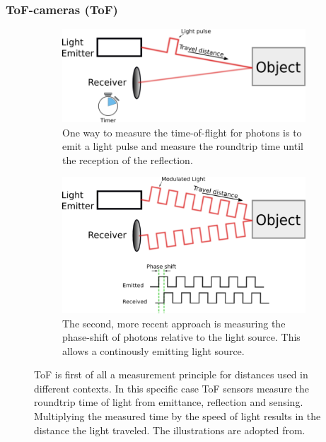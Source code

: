 \subsubsection{\acrlong{ToF}-cameras (\acrshort{ToF})}

\begin{figure}[H]
    \centering
    \begin{subfigure}[t]{0.45\textwidth}
        \includegraphics[width=\textwidth]{chapter03/img/tof_traveltime_original.png}
        \caption{One way to measure the time-of-flight for photons is to emit a light pulse and measure the roundtrip time until the reception of the reflection.}\label{fig:tof_roundtrip}
    \end{subfigure}
    \begin{subfigure}[t]{0.45\textwidth}
        \includegraphics[width=\textwidth]{chapter03/img/tof_phase_shift_original.png}
        \caption{The second, more recent approach is measuring the phase-shift of photons relative to the light source. This allows a continously emitting light source.}\label{fig:tof_phase_shift}
    \end{subfigure}
    \caption[Illustration of two commonly used measuring principle for \acrshort{ToF} cameras]{\acrlong{ToF} is first of all a measurement principle for distances used in different contexts. In this specific case \acrshort{ToF} sensors measure the roundtrip time of light from emittance, reflection and sensing. Multiplying the measured time by the speed of light results in the distance the light traveled. The illustrations are adopted from\cite{tof_cameras}.}\label{fig:tof_illustration}
\end{figure}

